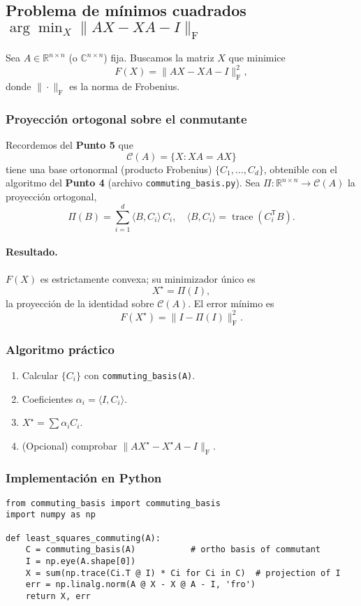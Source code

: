 \subsection{Problema de mínimos cuadrados $\displaystyle\arg\min_{X}\|AX-XA-I\|_{\mathrm{F}}$}

Sea $A \in \mathbb{R}^{n\times n}$ (o $\mathbb{C}^{n\times n}$) fija.
Buscamos la matriz $X$ que minimice
\[
F(X)=\|AX - XA - I\|_{\mathrm{F}}^{2},
\]
donde $\|\cdot\|_{\mathrm{F}}$ es la norma de Frobenius.

\subsubsection{Proyección ortogonal sobre el conmutante}
Recordemos del \textbf{Punto 5} que
\[
\mathcal{C}(A)=\{X \colon XA = AX\}
\]
tiene una base ortonormal (producto Frobenius)  
$\{C_1,\dots,C_d\}$, obtenible con el algoritmo del \textbf{Punto 4}
(archivo \texttt{commuting\_basis.py}).  
Sea $\Pi\colon\mathbb{R}^{n\times n}\!\to\!\mathcal{C}(A)$ la proyección
ortogonal,
\[
\Pi(B)=\sum_{i=1}^{d}\langle B, C_i\rangle\,C_i,
\quad
\langle B, C_i\rangle=\operatorname{trace}(C_i^{\mathsf T}B).
\]

\paragraph{Resultado.}
$F(X)$ es estrictamente convexa; su minimizador único es
\[
X^{\star}=\Pi(I),
\]
la proyección de la identidad sobre $\mathcal{C}(A)$.  
El error mínimo es
\[
F(X^{\star})=\bigl\|I-\Pi(I)\bigr\|_{\mathrm{F}}^{2}.
\]

\subsubsection{Algoritmo práctico}
\begin{enumerate}
  \item Calcular $\{C_i\}$ con \verb|commuting_basis(A)|.
  \item Coeficientes $\alpha_i=\langle I,C_i\rangle$.
  \item $X^{\star}=\sum \alpha_i C_i$.
  \item (Opcional) comprobar $\|AX^{\star}-X^{\star}A-I\|_{\mathrm{F}}$.
\end{enumerate}

\subsubsection{Implementación en Python}
\begin{verbatim}
from commuting_basis import commuting_basis
import numpy as np

def least_squares_commuting(A):
    C = commuting_basis(A)           # ortho basis of commutant
    I = np.eye(A.shape[0])
    X = sum(np.trace(Ci.T @ I) * Ci for Ci in C)  # projection of I
    err = np.linalg.norm(A @ X - X @ A - I, 'fro')
    return X, err
\end{verbatim}

